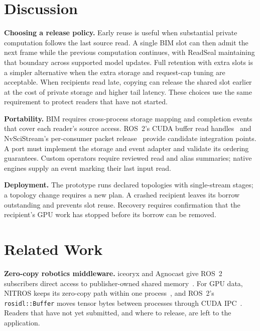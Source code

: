 \documentclass[conference]{IEEEtran}
\newcommand{\code}[1]{\texttt{#1}}
\begin{document}
\section{Discussion}
\label{sec:discussion}

\textbf{Choosing a release policy.} Early reuse is useful when substantial private computation follows the last source read. A single BIM slot can then admit the next frame while the previous computation continues, with ReadSeal maintaining that boundary across supported model updates. Full retention with extra slots is a simpler alternative when the extra storage and request-cap tuning are acceptable. When recipients read late, copying can release the shared slot earlier at the cost of private storage and higher tail latency. These choices use the same requirement to protect readers that have not started.

\textbf{Portability.} BIM requires cross-process storage mapping and completion events that cover each reader's source access. ROS~2's CUDA buffer read handles~\cite{cudabackend} and NvSciStream's per-consumer packet release~\cite{nvscistream} provide candidate integration points. A port must implement the storage and event adapter and validate its ordering guarantees. Custom operators require reviewed read and alias summaries; native engines supply an event marking their last input read.

\textbf{Deployment.} The prototype runs declared topologies with single-stream stages; a topology change requires a new plan. A crashed recipient leaves its borrow outstanding and prevents slot reuse. Recovery requires confirmation that the recipient's GPU work has stopped before its borrow can be removed.

\section{Related Work}
\label{sec:related}

\textbf{Zero-copy robotics middleware.} iceoryx and Agnocast give ROS~2 subscribers direct access to publisher-owned shared memory~\cite{iceoryx,agnocast}. For GPU data, NITROS keeps its zero-copy path within one process~\cite{nitros}, and ROS~2's \code{rosidl::Buffer} moves tensor bytes between processes through CUDA IPC~\cite{rosidlbuffer}. Readers that have not yet submitted, and where to release, are left to the application.
\end{document}
